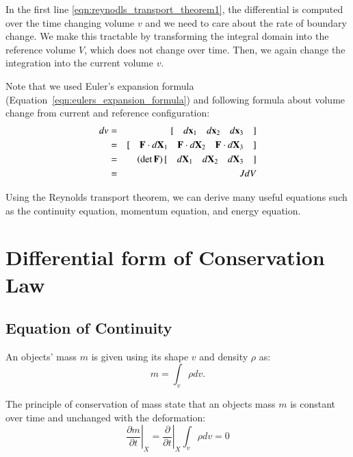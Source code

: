 In the first line \eqref{eqn:reynodls_transport_theorem1}, the differential is computed over the time changing volume $v$ and we need to care about the rate of boundary change.
%
We make this tractable by transforming the integral domain into the reference volume $V$, which does not change over time.
Then, we again change the integration into the current volume $v$.





Note that we used Euler's expansion formula (Equation~\ref{eqn:eulers_expansion_formula}) and following formula about volume change from current and reference configuration:
%
\begin{eqnarray}
dv  
&=&  \left[\quad d{\mathbf{x}_1} \quad d{\mathbf{x}_2} \quad d{\mathbf{x}_3} \quad \right]\\  
&=&  \left[\quad {\mathbf{F}} \cdot d{\mathbf{X}_1} \quad {\mathbf{F}} \cdot d{\mathbf{X}_2} \quad {\mathbf{F}} \cdot d{\mathbf{X}_3} \quad \right]\\  
&=&  (\det{\mathbf{F}})\left[ \quad d{\mathbf{X}_1} \quad d{\mathbf{X}_2} \quad d{\mathbf{X}_3} \quad \right]\\  
&=&  JdV 
\end{eqnarray}


Using the Reynolds transport theorem, we can derive many useful equations such as the continuity equation, momentum equation, and energy equation.



\section{Differential form of Conservation Law}


\subsection{Equation of Continuity}

An objects' mass $m$ is given using its shape $v$ and density $\rho$ as:
%
\begin{equation}
m=\int_v\rho dv.
\end{equation}
%

The principle of conservation of mass state that an objects mass $m$ is constant over time and unchanged with the deformation:
\begin{equation}
\left.\frac{\partial{m}}{\partial{t}}\right|_{X}  =  \left.\frac{\partial}{\partial{t}}\right|_{X}\int_v\rho dv =0 
\end{equation}



